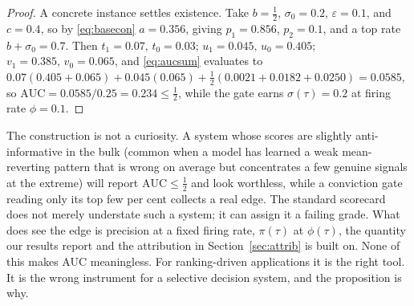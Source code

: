\documentclass[10pt,a4paper,oneside]{article}
\theoremstyle{definition}
\theoremstyle{plain}
\begin{document}
\begin{proof}
A concrete instance settles existence. Take $b=\tfrac12$, $\sigma_0=0.2$,
$\varepsilon=0.1$, and $c=0.4$, so by \eqref{eq:basecon} $a=0.356$, giving $p_1=0.856$,
$p_2=0.1$, and a top rate $b+\sigma_0=0.7$. Then $t_1=0.07,\,t_0=0.03$;
$u_1=0.045,\,u_0=0.405$; $v_1=0.385,\,v_0=0.065$, and \eqref{eq:aucsum} evaluates to
$0.07(0.405{+}0.065)+0.045(0.065)+\tfrac12(0.0021{+}0.0182{+}0.0250)=0.0585$, so
$\mathrm{AUC}=0.0585/0.25=0.234\le\tfrac12$, while the gate earns $\sigma(\tau)=0.2$ at
firing rate $\phi=0.1$.
\end{proof}

The construction is not a curiosity. A system whose scores are slightly
anti-informative in the bulk (common when a model has learned a weak mean-reverting
pattern that is wrong on average but concentrates a few genuine signals at the
extreme) will report $\mathrm{AUC}\le\tfrac12$ and look worthless, while a conviction
gate reading only its top few per cent collects a real edge. The standard scorecard
does not merely understate such a system; it can assign it a failing grade. What does
see the edge is precision at a fixed firing rate, $\pi(\tau)$ at $\phi(\tau)$, the
quantity our results report and the attribution in Section~\ref{sec:attrib} is built
on. None of this makes AUC meaningless. For ranking-driven applications it is the
right tool. It is the wrong instrument for a selective decision system, and the
proposition is why.
\end{document}
